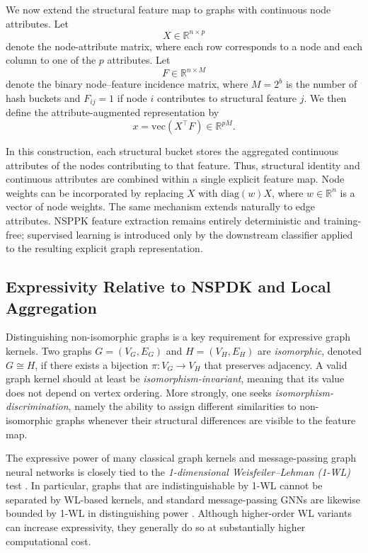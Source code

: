 We now extend the structural feature map to graphs with continuous node
attributes. Let
\[
X\in\mathbb{R}^{n\times p}
\]
denote the node-attribute matrix, where each row corresponds to a node and each
column to one of the $p$ attributes. Let
\[
F\in\mathbb{R}^{n\times M}
\]
denote the binary node--feature incidence matrix, where $M=2^b$ is the number of hash buckets and $F_{ij}=1$ if node $i$ contributes to structural feature
$j$. We then define the attribute-augmented representation by
\[
x = \mathrm{vec}(X^\top F)\in\mathbb{R}^{pM}.
\]

In this construction, each structural bucket stores the aggregated continuous
attributes of the nodes contributing to that feature. Thus, structural identity
and continuous attributes are combined within a single explicit feature map.
Node weights can be incorporated by replacing $X$ with $\mathrm{diag}(w)X$,
where $w\in\mathbb{R}^n$ is a vector of node weights. The same mechanism
extends naturally to edge attributes. NSPPK feature extraction remains entirely
deterministic and training-free; supervised learning is introduced only by the
downstream classifier applied to the resulting explicit graph representation.

\subsection{Expressivity Relative to NSPDK and Local Aggregation}
\label{sec:isomorphism}

Distinguishing non-isomorphic graphs is a key requirement for expressive graph
kernels. Two graphs $G=(V_G,E_G)$ and $H=(V_H,E_H)$ are \emph{isomorphic},
denoted $G\cong H$, if there exists a bijection $\pi:V_G\to V_H$ that
preserves adjacency. A valid graph kernel should at least be
\emph{isomorphism-invariant}, meaning that its value does not depend on vertex
ordering. More strongly, one seeks \emph{isomorphism-discrimination}, namely the
ability to assign different similarities to non-isomorphic graphs whenever
their structural differences are visible to the feature map.

The expressive power of many classical graph kernels and message-passing graph
neural networks is closely tied to the
\emph{1-dimensional Weisfeiler--Lehman (1-WL)} test
\citep{shervashidze2011weisfeiler,morris2019weisfeiler}. In particular,
graphs that are indistinguishable by 1-WL cannot be separated by WL-based
kernels, and standard message-passing GNNs are likewise bounded by 1-WL in
distinguishing power \citep{xu2019powerful}. Although higher-order WL variants
can increase expressivity, they generally do so at substantially higher
computational cost.

